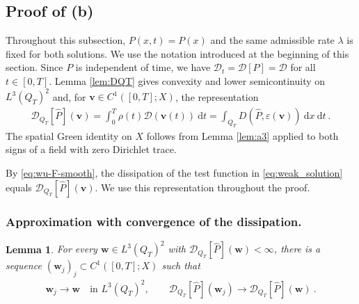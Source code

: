 \documentclass{article}
\newtheorem{lemma}[theorem]{Lemma}
\theoremstyle{definition}
\newcommand{\bfv}{\boldsymbol{v}}
\newcommand{\bfw}{\boldsymbol{w}}
\newcommand{\D}{\mathcal{D}}
\newcommand{\dd}{\:\mathrm{d}}
\begin{document}
\subsection{Proof of (b)}
Throughout this subsection, $P(x,t)=P(x)$ and the same admissible rate
$\lambda$ is fixed for both solutions. We use the notation introduced at
the beginning of this section. Since $P$ is independent of time, we have
$\D_t=\D[P]=\D$ for all $t\in[0,T]$.
Lemma \ref{lem:DQT} gives convexity and lower semicontinuity on $L^3(Q_T)^2$ and,
for $\bfv\in C^1([0,T];X)$, the representation
\begin{align}\label{eq:wu-F-smooth}
 \D_{Q_T}[\hat P](\bfv)=\int_0^T\rho(t)\D(\bfv(t))\dd t
       =\int_{Q_T} D(\hat P,\varepsilon(\bfv))\dd x\dd t \ .
\end{align}
The spatial Green identity on $X$ follows from Lemma \ref{lem:a3} applied
to both signs of a field with zero Dirichlet trace.

By \eqref{eq:wu-F-smooth}, the dissipation of the test function in
\eqref{eq:weak_solution} equals $\D_{Q_T}[\hat P](\bfv)$. We use this
representation throughout the proof.

\subsubsection{Approximation with convergence of the dissipation.}

\begin{lemma}\label{lem:wu-relaxation}
For every $\bfw\in L^3(Q_T)^2$ with $\D_{Q_T}[\hat P](\bfw)<\infty$, there is
a sequence $(\bfw_j)_j\subset C^1([0,T];X)$ such that
\begin{align*}
 \bfw_j\rightarrow \bfw\quad\text{in }L^3(Q_T)^2,\qquad
 \D_{Q_T}[\hat P](\bfw_j)\rightarrow\D_{Q_T}[\hat P](\bfw) \ .
\end{align*}
\end{lemma}
\end{document}
